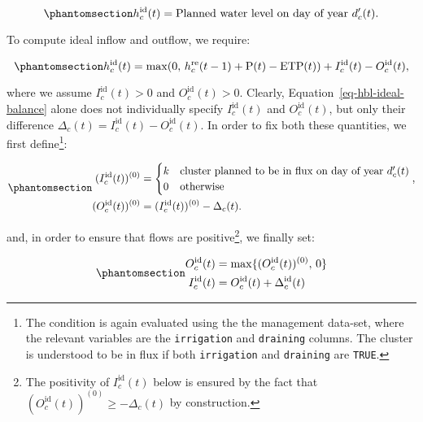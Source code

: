 \documentclass[
  letterpaper,
  DIV=11,
  numbers=noendperiod]{scrreprt}
\begin{document}
\begin{equation}\phantomsection\label{eq-hbl-ideal-height}{
h_c^\text{id}(t) = \text{Planned water level on day of year }d_c^\prime(t).
}\end{equation}

To compute ideal inflow and outflow, we require:

\begin{equation}\phantomsection\label{eq-hbl-ideal-balance}{
h_c^\text{id}(t) = \max(0,\,h_c^\text{re}(t-1)+\text{P}(t)-\text{ETP}(t)) + I_c ^\text{id}(t)-O_c ^\text{id}(t),
}\end{equation}

where we assume \(I_c ^\text{id}(t) >0\) and \(O_c ^\text{id}(t)>0\).
Clearly, Equation~\ref{eq-hbl-ideal-balance} alone does not individually
specify \(I_c ^\text{id}(t)\) and \(O_c ^\text{id}(t)\), but only their
difference \(\Delta _c (t) = I_c ^\text{id}(t) - O_c ^\text{id}(t)\). In
order to fix both these quantities, we first define\footnote{The
  condition is again evaluated using the the management data-set, where
  the relevant variables are the \texttt{irrigation} and
  \texttt{draining} columns. The cluster is understood to be in flux if
  both \texttt{irrigation} and \texttt{draining} are \texttt{TRUE}.}:

\begin{equation}\phantomsection\label{eq-hbl-ideal-flows-zero}{
\begin{split}
(I_c ^\text{id}(t))^{(0)}&= \begin{cases}
  k  & \text{cluster planned to be in flux on day of year } d_c^\prime(t) \\
  0 & \text{otherwise}
\end{cases},\\
(O_c ^\text{id}(t))^{(0)}&=(I_c ^\text{id}(t))^{(0)}-\Delta_c(t).
\end{split}
}\end{equation}

and, in order to ensure that flows are positive\footnote{The positivity
  of \(I_c ^\text{id}(t)\) below is ensured by the fact that
  \((O_c ^\text{id}(t))^{(0)}\geq-\Delta_c(t)\) by construction.}, we
finally set:

\begin{equation}\phantomsection\label{eq-hbl-ideal-flows}{
\begin{split}
O_c ^\text{id}(t) &= \max\lbrace(O_c ^\text{id}(t))^{(0)},\,0\rbrace\\
I_c ^\text{id}(t) &= O_c ^\text{id}(t) + \Delta_c ^\text{id}(t)
\end{split}
}\end{equation}
\end{document}
